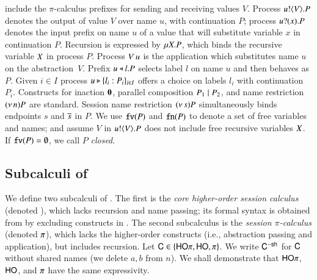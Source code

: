 include the
$\pi$-calculus prefixes for sending and receiving values $V$.
Process $u ! \langle V \rangle . P$ denotes the output of value $V$
over name $u$, with continuation $P$;
process $u ? (x) . P$ denotes the input prefix on name $u$ of a value
that 
will substitute variable $x$ in continuation $P$. 
Recursion is expressed by $\mu X. P$,
which binds the recursive variable $X$ in process $P$.
Process 
$V\, {u}$ 
is the application
which substitutes name $u$ on the abstraction~$V$. 
Prefix $u \triangleleft l . P$ selects label $l$ on name $u$ and then behaves as $P$.
Given $i \in I$ process $u \triangleright \{l_i: P_i\}_{i \in I}$ offers a choice on labels $l_i$ with
continuation $P_i$.
Constructs for 
inaction $\mathbf{0}$,  parallel composition $P_1 \;|\; P_2$, and 
name restriction $(\nu\, n) P$ are standard.
Session name restriction $(\nu\, s) P$ simultaneously binds endpoints $s$ and $\overline{s}$ in $P$.
We use $\mathtt{fv}(P)$ and $\mathtt{fn}(P)$ to denote a set of free 
variables and names; 
and assume $V$ in $u ! \langle V \rangle .{P}$ does not include free recursive 
variables $X$. 
If $\mathtt{fv}(P) = \emptyset$, we call $P$ {\em closed}.

\subsection{Subcalculi of \HOp}
\label{subsec:subcalculi}
\noi
We define two subcalculi of \HOp. 
The first is the 
{\em core higher-order session calculus} (denoted \HO),
which lacks recursion and name passing; its 
formal syntax is obtained from  by excluding 
constructs in .
The second subcalculus is 
the {\em session $\pi$-calculus} 
(denoted $\pi$), which 
lacks  the
higher-order constructs
(i.e., abstraction passing and application), but includes recursion.
Let $\mathsf{C} \in \{\mathsf{HO}\pi, \mathsf{HO}, \pi\}$. We write 
$\mathsf{C}^{-\mathsf{sh}}$ for $\mathsf{C}$ without shared names
(we delete $a,b$ from $n$). 
We shall demonstrate that 
$\mathsf{HO}\pi$, $\mathsf{HO}$, and $\pi$ have the same expressivity.

